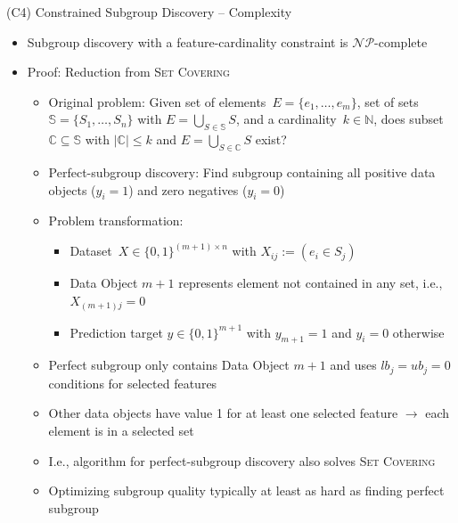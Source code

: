 \documentclass[en, navbarinline, handout]{sdqbeamer}
\begin{document}
\begin{frame}[t]{(C4) Constrained Subgroup Discovery -- Complexity}
	\begin{itemize}
		\item Subgroup discovery with a feature-cardinality constraint is $\mathcal{NP}$-complete
		\pause
		\item Proof: Reduction from \textsc{Set Covering}~\cite{karp1972reducibility}
		\begin{itemize}
			\item Original problem: Given set of elements~$E = \{e_1, \dots, e_m\}$, set of sets~$\mathbb{S} = \{S_1,  \dots, S_n\}$ with $E = \bigcup_{S \in \mathbb{S}} S$, and a cardinality~$k \in \mathbb{N}$, does subset $\mathbb{C} \subseteq \mathbb{S}$ with $|\mathbb{C}| \leq k$ and $E = \bigcup_{S \in \mathbb{C}} S$ exist?
			\pause
			\item Perfect-subgroup discovery: Find subgroup containing all positive data objects ($y_i = 1$) and zero negatives ($y_i = 0$)
			\pause
			\item Problem transformation:
			\begin{itemize}
				\item Dataset~$X \in \{0, 1\}^{(m + 1) \times n}$ with $X_{ij} := (e_i \in S_j)$
				\item Data Object $m+1$ represents element not contained in any set, i.e., $X_{(m+1)j} = 0$
				\item Prediction target $y \in \{0, 1\}^{m+1}$ with $y_{m+1} = 1$ and $y_i = 0$ otherwise
			\end{itemize}
			\pause
			\item Perfect subgroup only contains Data Object $m+1$ and uses $\mathit{lb}_j = \mathit{ub}_j = 0$ conditions for selected features
			\item Other data objects have value 1 for at least one selected feature $\rightarrow$ each element is in a selected set
			\pause
			\item I.e., algorithm for perfect-subgroup discovery also solves \textsc{Set Covering}
			\pause
			\item Optimizing subgroup quality typically at least as hard as finding perfect subgroup
		\end{itemize}
	\end{itemize}
\end{frame}
\end{document}
